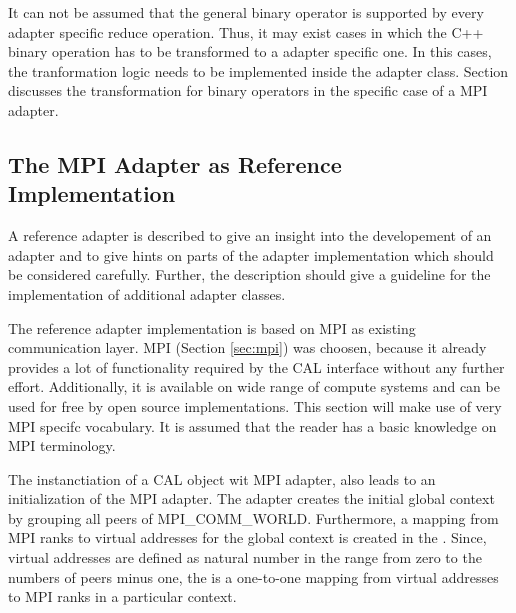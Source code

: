 It can not be assumed that the general binary operator is supported by
every adapter specific reduce operation.  Thus, it may exist cases in
which the C++ binary operation has to be transformed to a adapter
specific one. In this cases, the tranformation logic needs to be
implemented inside the adapter class. Section \label{sec:bin_operator}
discusses the transformation for binary operators in the specific case
of a MPI adapter.

\subsection{The MPI Adapter as Reference Implementation}
\label{sec:cal_mpi_adapter}

A reference adapter is described to give an insight into the
developement of an adapter and to give hints on parts of the adapter
implementation which should be considered carefully.  Further, the
description should give a guideline for the implementation of
additional adapter classes.

The reference adapter implementation is based on MPI as existing
communication layer.  MPI (Section \ref{sec:mpi}) was choosen,
because it already provides a lot of functionality required by the CAL
interface without any further effort. Additionally, it is available on wide range
of compute systems and can be used for free by open source
implementations. This section will make use of very MPI specifc 
vocabulary. It is assumed that the reader has a basic knowledge
on MPI terminology.

The instanctiation of a CAL object wit MPI adapter, also leads to an
initialization of the MPI adapter. The adapter creates the initial
global context by grouping all peers of MPI\_COMM\_WORLD.
Furthermore, a mapping from MPI ranks to virtual addresses for the
global context is created in the . Since, virtual
addresses are defined as natural number in the range from zero to the
numbers of peers minus one, the  is a one-to-one mapping
from virtual addresses to MPI ranks in a particular context.


